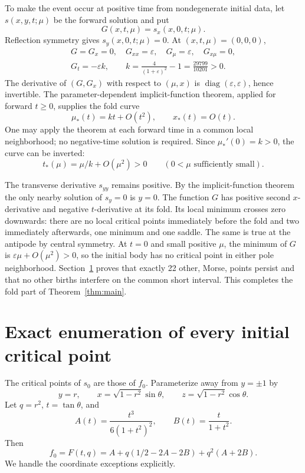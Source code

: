\documentclass[11pt,a4paper]{article}
\theoremstyle{remark}\newtheorem{remark}[theorem]{Remark}
\begin{document}
To make the event occur at positive time from nondegenerate initial data, let \(s(x,y,t;\mu)\) be the forward solution and put
\[
 G(x,t,\mu)=s_x(x,0,t;\mu).
\]
Reflection symmetry gives \(s_y(x,0,t;\mu)=0\). At \((x,t,\mu)=(0,0,0)\),
\[
 \begin{gathered}
 G=G_x=0,\quad G_{xx}=\varepsilon,\quad
 G_\mu=\varepsilon,\quad G_{x\mu}=0,\\
 G_t=-\varepsilon k,\qquad
 k=\frac4{(1+\varepsilon)^2}-1=\frac{29799}{10201}>0.
 \end{gathered}
\]
The derivative of \((G,G_x)\) with respect to \((\mu,x)\) is \(\operatorname{diag}(\varepsilon,\varepsilon)\), hence invertible. The parameter-dependent implicit-function theorem, applied for forward \(t\ge0\), supplies the fold curve
\[
 \mu_*(t)=kt+O(t^2),\qquad x_*(t)=O(t).
\]
One may apply the theorem at each forward time in a common local neighborhood; no negative-time solution is required. Since \(\mu_*'(0)=k>0\), the curve can be inverted:
\[
 t_*(\mu)=\mu/k+O(\mu^2)>0\qquad(0<\mu\text{ sufficiently small}).
\]

The transverse derivative \(s_{yy}\) remains positive. By the implicit-function theorem the only nearby solution of \(s_y=0\) is \(y=0\). The function \(G\) has positive second \(x\)-derivative and negative \(t\)-derivative at its fold. Its local minimum crosses zero downwards: there are no local critical points immediately before the fold and two immediately afterwards, one minimum and one saddle. The same is true at the antipode by central symmetry. At \(t=0\) and small positive \(\mu\), the minimum of \(G\) is \(\varepsilon\mu+O(\mu^2)>0\), so the initial body has no critical point in either pole neighborhood. Section~\ref{sec:global} proves that exactly 22 other, Morse, points persist and that no other births interfere on the common short interval. This completes the fold part of Theorem~\ref{thm:main}.

\section{Exact enumeration of every initial critical point}\label{sec:global}
The critical points of \(s_0\) are those of \(f_0\). Parameterize away from \(y=\pm1\) by
\[
 y=r,\qquad x=\sqrt{1-r^2}\sin\theta,\qquad
 z=\sqrt{1-r^2}\cos\theta.
\]
Let \(q=r^2\), \(t=\tan\theta\), and
\[
 A(t)=\frac{t^3}{6(1+t^2)^2},\qquad B(t)=\frac{t}{1+t^2}.
\]
Then
\begin{equation}\label{eq:reduced}
 f_0=F(t,q)=A+q(1/2-2A-2B)+q^2(A+2B).
\end{equation}
We handle the coordinate exceptions explicitly.
\end{document}
